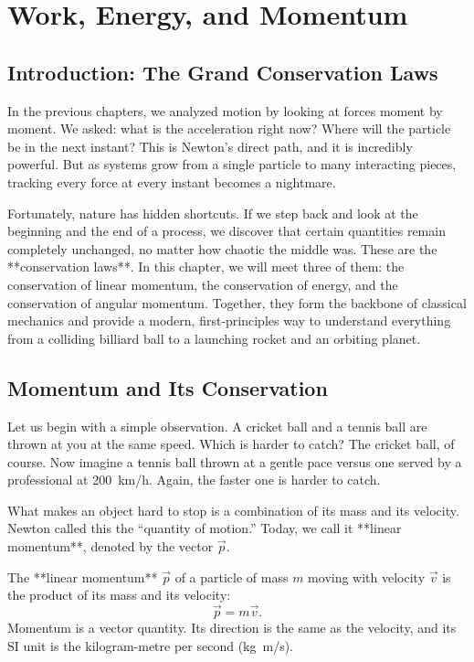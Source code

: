 \chapter{Work, Energy, and Momentum}

\section{Introduction: The Grand Conservation Laws}

In the previous chapters, we analyzed motion by looking at forces moment by moment. We asked: what is the acceleration right now? Where will the particle be in the next instant? This is Newton’s direct path, and it is incredibly powerful. But as systems grow from a single particle to many interacting pieces, tracking every force at every instant becomes a nightmare. 

Fortunately, nature has hidden shortcuts. If we step back and look at the beginning and the end of a process, we discover that certain quantities remain completely unchanged, no matter how chaotic the middle was. These are the **conservation laws**. In this chapter, we will meet three of them: the conservation of linear momentum, the conservation of energy, and the conservation of angular momentum. Together, they form the backbone of classical mechanics and provide a modern, first-principles way to understand everything from a colliding billiard ball to a launching rocket and an orbiting planet.

\section{Momentum and Its Conservation}

Let us begin with a simple observation. A cricket ball and a tennis ball are thrown at you at the same speed. Which is harder to catch? The cricket ball, of course. Now imagine a tennis ball thrown at a gentle pace versus one served by a professional at \SI{200}{km/h}. Again, the faster one is harder to catch.

What makes an object hard to stop is a combination of its mass and its velocity. Newton called this the ``quantity of motion.'' Today, we call it **linear momentum**, denoted by the vector $\vec{p}$.

\begin{keybox}
The **linear momentum** $\vec{p}$ of a particle of mass $m$ moving with velocity $\vec{v}$ is the product of its mass and its velocity:
\begin{equation}
    \vec{p} = m \vec{v}.
\end{equation}
Momentum is a vector quantity. Its direction is the same as the velocity, and its SI unit is the kilogram-metre per second (\si{kg.m/s}).
\end{keybox}

